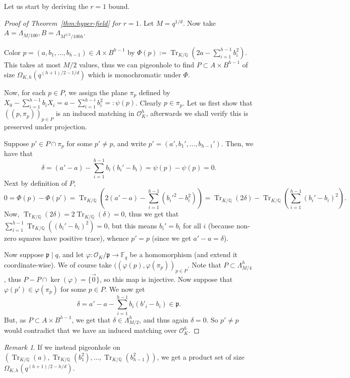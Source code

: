 \documentclass[11pt]{article}
\theoremstyle{plain}
\theoremstyle{remark}
\newtheorem{remark}[theorem]{Remark}
\newcommand{\F}{\mathbb F}
\newcommand{\Q}{\mathbb Q}
\newcommand{\OK}{\mathcal O_K}
\newcommand{\Tr}{\operatorname{Tr}_{K/\Q}}
\begin{document}
Let us start by deriving the $r=1$ bound.
\begin{proof}[Proof of Theorem~\ref{thm:hyper-field} for $r=1$]
    Let $M = q^{1/d}$. Now take $ A = \Lambda_{M/100}, B = \Lambda_{M^{1/2}/100 h}$.

    Color $p=(a,b_1,\dots,b_{h-1})\in A\times B^{h-1}$ by $\Phi(p):=\Tr(2a-\sum_{i=1}^{h-1} b_i^2)$. This takes at most $M/2$ values, thus we can pigeonhole to find $P\subset A\times B^{h-1}$ of size $\Omega_{K,h}(q^{(h+1)/2-1/d})$ which is monochromatic under $\Phi$. 

    Now, for each $p\in P$, we assign the plane $\pi_p $ defined by $X_0 -\sum_{i=1}^{h-1} b_i X_i = a-\sum_{i=1}^{h-i}b_i^2=:\psi(p)$. Clearly $p\in \pi_p$. Let us first show that $((p,\pi_p))_{p\in P}$ is an induced matching in $\OK^h$, afterwards we shall verify this is preserved under projection.

    Suppose $p'\in P\cap \pi_p$ for some $p'\neq p$, and write $p' = (a',b_1',\dots,b_{h-1}')$. Then, we have that \[\delta = (a'-a)-\sum_{i=1}^{h-1}b_i(b_i'-b_i) = \psi(p)-\psi(p)=0.\]Next by definition of $P$, \[0=\Phi(p)-\Phi(p')=\Tr(2(a'-a) -\sum_{i=1}^{h-1}(b_i'^2-b_i^2)) = \Tr(2\delta)-\Tr(\sum_{i=1}^{h-1}(b_i'-b_i)^2) .\]Now, $\Tr(2\delta) = 2\Tr(\delta) =0$, thus we get that $\sum_{i=1}^{h-1}\Tr((b_i'-b_i)^2)=0$, but this means $b_i'=b_i$ for all $i$ (because non-zero squares have positive trace), whence $p'=p$ (since we get $a'-a= \delta$).  
    
    
    Now suppose $\mathfrak{p}\mid q$, and let $\varphi:\OK/\mathfrak{p}\to \F_q$ be a homomorphism (and extend it coordinate-wise). We of course take $((\varphi(p),\varphi(\pi_p))_{p\in P}$. Note that $P\subset \Lambda_{M/4}^h$, thus $P-P\cap \ker(\varphi) = \{\vec{0}\}$, so this map is injective. Now suppose that $\varphi(p')\in \varphi(\pi_p)$ for some $p\in P$. We now get 
    \[\delta = a'-a -\sum_{i=1}^{h-1}b_i(b'_i-b_i) \in \mathfrak{p}.\]But, as $P\subset A\times B^{h-1}$, we get that $\delta\in \Lambda_{M/2}^{h}$, and thus again $\delta=0$. So $p'\neq p$ would contradict that we have an induced matching over $\OK^h$.
\end{proof}
\begin{remark}
    If we instead pigeonhole on $(\Tr(a),\Tr(b_1^2),\dots,\Tr(b_{h-1}^2))$, we get a product set of size $\Omega_{K,h}(q^{(h+1)/2-h/d})$.
\end{remark}
\end{document}

